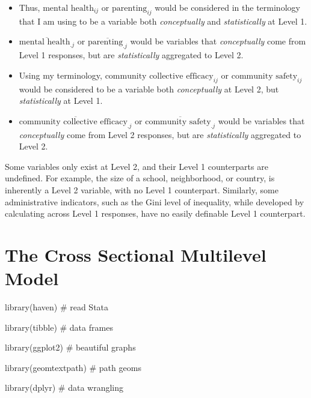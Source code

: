 \documentclass[
  letterpaper,
  DIV=11,
  numbers=noendperiod]{scrreprt}
\newenvironment{Shaded}{\begin{snugshade}}{\end{snugshade}}
\newcommand{\CommentTok}[1]{\textcolor[rgb]{0.37,0.37,0.37}{#1}}
\newcommand{\FunctionTok}[1]{\textcolor[rgb]{0.28,0.35,0.67}{#1}}
\newcommand{\NormalTok}[1]{\textcolor[rgb]{0.00,0.23,0.31}{#1}}
\begin{document}
\begin{itemize}
\item
  Thus, \(\text{mental health}_{ij}\) or \(\text{parenting}_{ij}\) would
  be considered in the terminology that I am using to be a variable both
  \emph{conceptually} and \emph{statistically} at Level 1.
\item
  \(\overline{\text{mental health}_{.j}}\) or
  \(\overline{\text{parenting}_{.j}}\) would be variables that
  \emph{conceptually} come from Level 1 responses, but are
  \emph{statistically} aggregated to Level 2.
\item
  Using my terminology, \(\text{community collective efficacy}_{ij}\) or
  \(\text{community safety}_{ij}\) would be considered to be a variable
  both \emph{conceptually} at Level 2, but \emph{statistically} at Level
  1.
\item
  \(\overline{\text{community collective efficacy}_{.j}}\) or
  \(\overline{\text{community safety}_{.j}}\) would be variables that
  \emph{conceptually} come from Level 2 responses, but are
  \emph{statistically} aggregated to Level 2.
\end{itemize}

Some variables only exist at Level 2, and their Level 1 counterparts are
undefined. For example, the size of a school, neighborhood, or country,
is inherently a Level 2 variable, with no Level 1 counterpart.
Similarly, some administrative indicators, such as the Gini level of
inequality, while developed by calculating across Level 1 responses,
have no easily definable Level 1 counterpart.


\hypertarget{the-cross-sectional-multilevel-model}{%
\chapter{The Cross Sectional Multilevel
Model}\label{the-cross-sectional-multilevel-model}}

\begin{Shaded}
\begin{Highlighting}[]
\FunctionTok{library}\NormalTok{(haven) }\CommentTok{\# read Stata}

\FunctionTok{library}\NormalTok{(tibble) }\CommentTok{\# data frames}

\FunctionTok{library}\NormalTok{(ggplot2) }\CommentTok{\# beautiful graphs}

\FunctionTok{library}\NormalTok{(geomtextpath) }\CommentTok{\# path geoms}

\FunctionTok{library}\NormalTok{(dplyr) }\CommentTok{\# data wrangling}
\end{Highlighting}
\end{Shaded}
\end{document}
